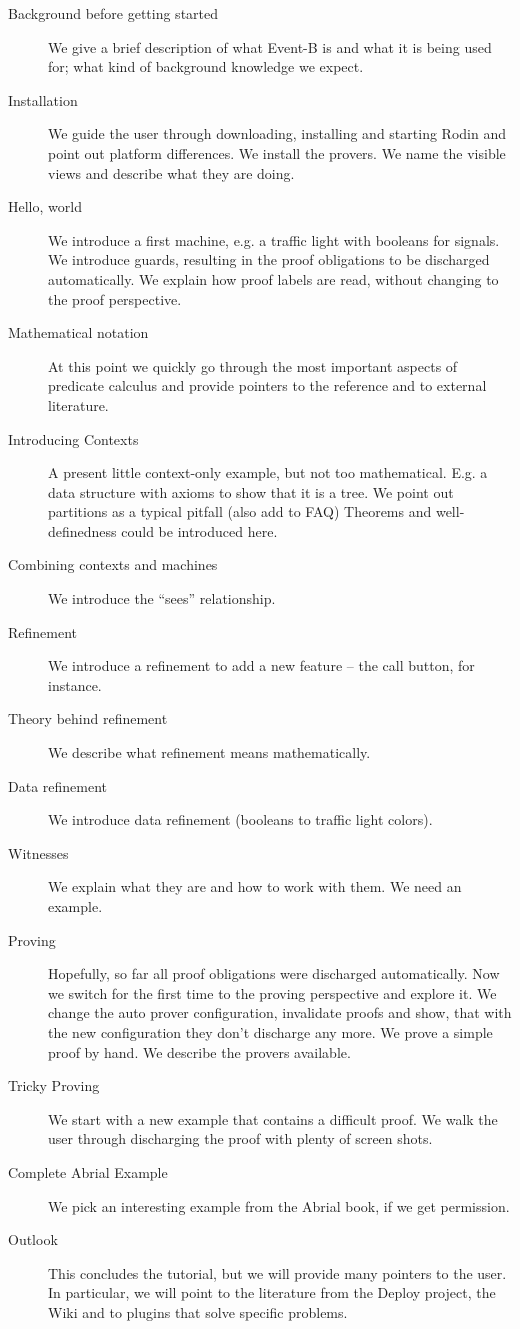 \begin{description}
	\item[Background before getting started] We give a brief description of what Event-B is and what it is being used for; what kind of background knowledge we expect.
	\item[Installation] We guide the user through downloading, installing and starting Rodin and point out platform differences.  We install the provers.  We name the visible views and describe what they are doing.
	\item[Hello, world] We introduce a first machine, e.g. a traffic light with booleans for signals. 
      We introduce guards, resulting in the proof obligations to be discharged automatically.
      We explain how proof labels are read, without changing to the proof perspective.
	\item[Mathematical notation] At this point we quickly go through the most important aspects of predicate calculus and provide pointers to the reference and to external literature.
	\item[Introducing Contexts] A present little context-only example, but not too mathematical.  E.g. a data structure with axioms to show that it is a tree. We point out partitions as a typical pitfall (also add to FAQ)
      Theorems and well-definedness could be introduced here.
	\item[Combining contexts and machines] We introduce the ``sees'' relationship.
	\item[Refinement] We introduce a refinement to add a new feature -- the call button, for instance.
	\item[Theory behind refinement] We describe what refinement means mathematically.
	\item[Data refinement] We introduce data refinement (booleans to traffic light colors).
	\item[Witnesses] We explain what they are and how to work with them.  We need an example.
	\item[Proving] Hopefully, so far all proof obligations were discharged automatically.  Now we switch for the first time to the proving perspective and explore it.
      We change the auto prover configuration, invalidate proofs and show, that with the new configuration they don't discharge any more.
      We prove a simple proof by hand.  We describe the provers available.
	\item[Tricky Proving] We start with a new example that contains a difficult proof.  We walk the user through discharging the proof with plenty of screen shots.
	\item[Complete Abrial Example] We pick an interesting example from the Abrial book, if we get permission.
	\item[Outlook] This concludes the tutorial, but we will provide many pointers to the user.  In particular, we will point to the literature from the Deploy project, the Wiki and to plugins that solve specific problems.
\end{description}




